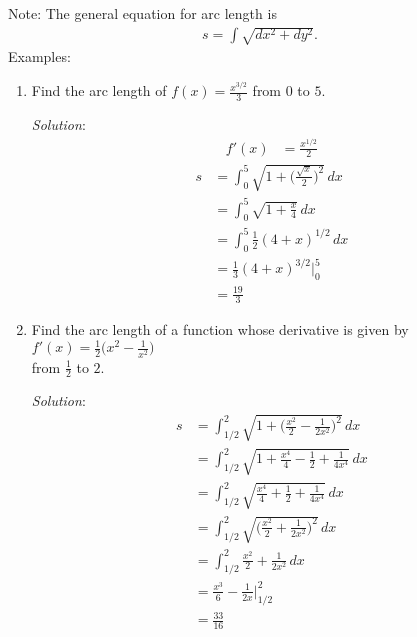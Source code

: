 \documentclass[16pt]{article}
\theoremstyle{remark}
\begin{document}
Note: The general equation for arc length is 
\begin{align*}
s = \int \sqrt{dx^2 + dy^2}.
\end{align*}
Examples:
\begin{enumerate}
\item Find the arc length of $\displaystyle{f(x) = \frac{x^{3/2}}{3}}$ from $0$ to $5$.
\begin{mdframed}[style=TheoremFrame]
\textit{Solution}:
\vspace*{-0.5cm}
\begin{align*}
f'(x) &= \frac{x^{1/2}}{2}
\end{align*}
\vspace*{-0.5cm}
\begin{align*}
s &= \int_0^5 \sqrt{1 + \bigg(\frac{\sqrt{x}}{2}\bigg)^2}\, dx\\
&= \int_0^5 \sqrt{1 + \frac{x}{4}}\, dx\\
&= \int_0^5 \frac{1}{2}(4+x)^{1/2} \, dx\\
&= \frac{1}{3} (4+x)^{3/2} \bigg|_0^5 \\
&= \frac{19}{3}
\end{align*}
\end{mdframed}
\newpage
\item Find the arc length of a function whose derivative is given by $\displaystyle{f'(x) = \frac{1}{2}\bigg(x^2 - \frac{1}{x^2}\bigg)}$\\ from $\displaystyle{\frac{1}{2}}$ to $2$.
\begin{mdframed}[style=TheoremFrame]
\textit{Solution}:
\vspace*{-0.5cm}
\begin{align*}
s &= \int_{1/2}^2 \sqrt{1+\bigg(\frac{x^2}{2}-\frac{1}{2x^2}\bigg)^2}\, dx\\
&= \int_{1/2}^2 \sqrt{1+\frac{x^4}{4}-\frac{1}{2}+\frac{1}{4x^4}}\, dx\\
&= \int_{1/2}^2 \sqrt{\frac{x^4}{4}+\frac{1}{2}+\frac{1}{4x^4}}\, dx\\
&= \int_{1/2}^2 \sqrt{\bigg(\frac{x^2}{2}+\frac{1}{2x^2}\bigg)^2}\, dx\\
&= \int_{1/2}^2 \frac{x^2}{2}+\frac{1}{2x^2} \, dx\\
&= \frac{x^3}{6}-\frac{1}{2x} \bigg|_{1/2}^2\\
&= \frac{33}{16}
\end{align*}
\end{mdframed}


\end{enumerate}
\end{document}
